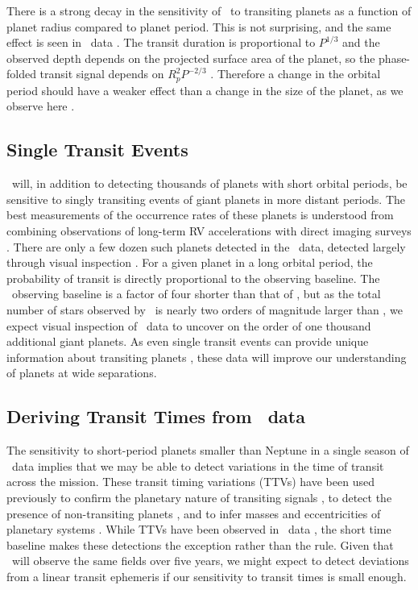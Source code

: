 There is a strong decay in the sensitivity of \WF\ to transiting planets as a function
of planet radius compared to planet period. This is not surprising, and the same effect
is seen in \kep\ data \citep{Burke14, Mullally15, Rowe15}. 
The transit duration is proportional to $P^{1/3}$ and the observed depth
depends on the projected surface area of the planet, so
the phase-folded transit signal depends on $R_p^2 P^{-2/3}$ \citep{Seager03}. Therefore a change in the orbital period should have a weaker effect than a change in the size of the planet, as we
observe here \citep[see also][]{Carter08}.

\subsection{Single Transit Events}

\WF\ will, in addition to detecting thousands of planets with short orbital periods, be
sensitive to singly transiting events of giant planets in more distant periods.
The best measurements of the occurrence rates of these planets is understood from 
combining observations of long-term RV accelerations with direct imaging surveys 
\citep[Gonzales et al. in prep]{Montet14}. 
There are only a few dozen such planets detected in the \kep\ data, detected largely
through visual inspection \citep{Wang15b, Uehara16}. 
For a given planet in a long orbital period, the probability of transit is directly
proportional to the observing baseline.
The \WF\ observing baseline is a factor of four shorter than that of \kep, but as the
total number of stars observed by \WF\ is nearly two orders of magnitude larger than 
\kep, we expect visual inspection of \WF\ data to uncover on the order of one thousand
additional giant planets. 
As even single transit events can provide unique information about transiting planets
\citep{Yee08, Osborn16}, these data will 
improve our understanding of planets at wide separations.


\subsection{Deriving Transit Times from \WF\ data}
\label{sec:ttvs}



The sensitivity to short-period planets smaller than Neptune in a single season of 
\WF\ data implies that we may be able to detect variations in the time of transit
across the mission.
These transit timing variations (TTVs) have been used previously to confirm the 
planetary nature of transiting signals \citep{Holman10, Fabrycky12, Ford12TTV, Xie13}, 
to detect the presence of non-transiting
planets \citep{Ballard11, Nesvorny12, Nesvorny13}, and to infer masses and
eccentricities of planetary systems 
\citep{Hadden14, Jontof-Hutter15, Jontof-Hutter16}.
While TTVs have been observed in \KT\ data \citep{Barros15}, the short time baseline makes
these detections the exception rather than the rule.
Given that \WF\ will observe the same fields over five years, we might expect to detect 
deviations from a linear transit ephemeris if our sensitivity to transit times is small enough.

